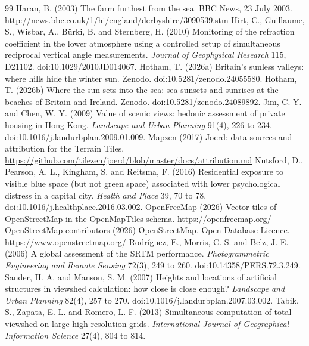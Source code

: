 \begin{thebibliography}{99}
 Haran, B. (2003) The farm furthest from the sea. BBC News, 23 July 2003. \url{http://news.bbc.co.uk/1/hi/england/derbyshire/3090539.stm}
 Hirt, C., Guillaume, S., Wisbar, A., B\"urki, B. and Sternberg, H. (2010) Monitoring of the refraction coefficient in the lower atmosphere using a controlled setup of simultaneous reciprocal vertical angle measurements. \textit{Journal of Geophysical Research} 115, D21102. doi:10.1029/2010JD014067.
 Hotham, T. (2026a) Britain's sunless valleys: where hills hide the winter sun. Zenodo. doi:10.5281/zenodo.24055580.
 Hotham, T. (2026b) Where the sun sets into the sea: sea sunsets and sunrises at the beaches of Britain and Ireland. Zenodo. doi:10.5281/zenodo.24089892.
 Jim, C. Y. and Chen, W. Y. (2009) Value of scenic views: hedonic assessment of private housing in Hong Kong. \textit{Landscape and Urban Planning} 91(4), 226 to 234. doi:10.1016/j.landurbplan.2009.01.009.
 Mapzen (2017) Joerd: data sources and attribution for the Terrain Tiles. \url{https://github.com/tilezen/joerd/blob/master/docs/attribution.md}
 Nutsford, D., Pearson, A. L., Kingham, S. and Reitsma, F. (2016) Residential exposure to visible blue space (but not green space) associated with lower psychological distress in a capital city. \textit{Health and Place} 39, 70 to 78. doi:10.1016/j.healthplace.2016.03.002.
 OpenFreeMap (2026) Vector tiles of OpenStreetMap in the OpenMapTiles schema. \url{https://openfreemap.org/}
 OpenStreetMap contributors (2026) OpenStreetMap. Open Database Licence. \url{https://www.openstreetmap.org/}
 Rodr\'iguez, E., Morris, C. S. and Belz, J. E. (2006) A global assessment of the SRTM performance. \textit{Photogrammetric Engineering and Remote Sensing} 72(3), 249 to 260. doi:10.14358/PERS.72.3.249.
 Sander, H. A. and Manson, S. M. (2007) Heights and locations of artificial structures in viewshed calculation: how close is close enough? \textit{Landscape and Urban Planning} 82(4), 257 to 270. doi:10.1016/j.landurbplan.2007.03.002.
 Tabik, S., Zapata, E. L. and Romero, L. F. (2013) Simultaneous computation of total viewshed on large high resolution grids. \textit{International Journal of Geographical Information Science} 27(4), 804 to 814.

\end{thebibliography}
